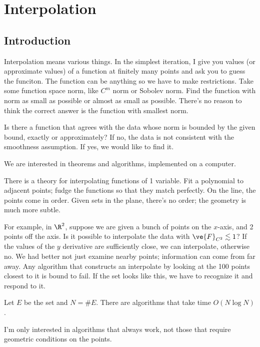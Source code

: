 \chapter{Interpolation}
\section{Introduction}

Interpolation means various things. In the simplest iteration, I give you values (or approximate values) of a function at finitely many points  and ask you  to guess the funciton. The function can be anything so we have to make restrictions. Take some function space norm, like $C^m$ norm or Sobolev norm. Find the function with norm as small as possible or almost as small as possible. There's no reason to think the correct answer is the function with smallest norm. 

Is there a function that agrees with the data whose norm is bounded by the given bound, exactly or approximately? 
If no, the data is not consistent with the  smoothness assumption.
If yes, we would like to find it.

We are interested in theorems and algorithms, implemented on a computer. 

There is a theory for interpolating functions of 1 variable. Fit a polynomial to adjacent points; fudge the functions so that they match perfectly. On the line, the points come in order. Given sets in the plane, there's no order; the geometry is much more subtle.

For example, in $\R^2$, 
suppose we are given a bunch of points on the $x$-axis, and 2 points off the axis. Is it possible to interpolate the data with $\ve{F}_{C^2}\lesssim 1$? If the values of the $y$ derivative are sufficiently close, we can interpolate, otherwise no. We had better not just examine nearby points; information can come from far away. Any algorithm that constructs an interpolate by looking at the 100 points closest to it is bound to fail. If the set looks like this, we have to recognize it and respond to it.

Let $E$ be the set and $N=\#E$.
There are algorithms that take time $O(N\log N)$. 

I'm only interested in algorithms that always work, not those that require geometric conditions on the points.

